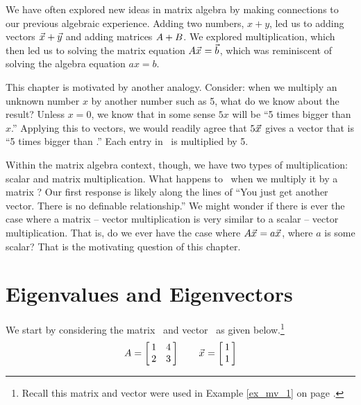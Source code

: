 We have often explored new ideas in matrix algebra by making connections to our previous algebraic experience. Adding two numbers, $x+y$, led us to adding vectors $\vx+\vy$ and adding matrices $\tta+\ttb$. We explored multiplication, which then led us to solving the matrix equation $\ttaxb$, which was reminiscent of solving the algebra equation $ax=b$. 

This chapter is motivated by another analogy. Consider: when we multiply an unknown number $x$ by another number such as 5, what do we know about the result? Unless $x=0$, we know that in some sense $5x$ will be ``5 times bigger than $x$.'' Applying this to vectors, we would readily agree that $5\vx$ gives a vector that is ``5 times bigger than \vx.'' Each entry in \vx\ is multiplied by 5.  

Within the matrix algebra context, though, we have two types of multiplication: scalar and matrix multiplication. What happens to \vx\ when we multiply it by a matrix \tta? Our first response is likely along the lines of ``You just get another vector. There is no definable relationship.'' We might wonder %
 if there is ever the case where a matrix -- vector multiplication is very similar to a scalar -- vector multiplication. That is, do we ever have the case where $\tta\vx = a\vx$, where $a$ is some scalar? That is the motivating question of this chapter.

\section{Eigenvalues and Eigenvectors}\label{sec:eigen}


We start by considering the matrix \tta\ and vector \vx\ as given below.\footnote{Recall this matrix and vector were used in Example \ref{ex_mv_1} on page \pageref{ex_mv_1}.} $$\tta = \bmx{cc} 1&4\\2&3\emx \quad \quad \vx = \bmx{c}1\\1\emx$$

